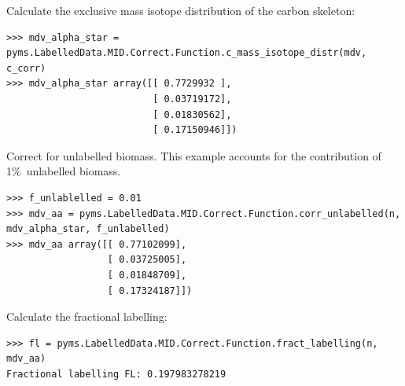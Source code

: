 Calculate the exclusive mass isotope distribution of the carbon skeleton:

\begin{verbatim}
>>> mdv_alpha_star = pyms.LabelledData.MID.Correct.Function.c_mass_isotope_distr(mdv, c_corr)
>>> mdv_alpha_star array([[ 0.7729932 ],
                          [ 0.03719172],
                          [ 0.01830562],
                          [ 0.17150946]])
\end{verbatim}

Correct for unlabelled biomass. This example accounts for the contribution
of 1\%\ unlabelled biomass.

\begin{verbatim}
>>> f_unlablelled = 0.01 
>>> mdv_aa = pyms.LabelledData.MID.Correct.Function.corr_unlabelled(n, mdv_alpha_star, f_unlabelled)
>>> mdv_aa array([[ 0.77102099],
                  [ 0.03725005],
                  [ 0.01848709],
                  [ 0.17324187]])
\end{verbatim}

Calculate the fractional labelling:

\begin{verbatim}
>>> fl = pyms.LabelledData.MID.Correct.Function.fract_labelling(n, mdv_aa)
Fractional labelling FL: 0.197983278219
\end{verbatim}
